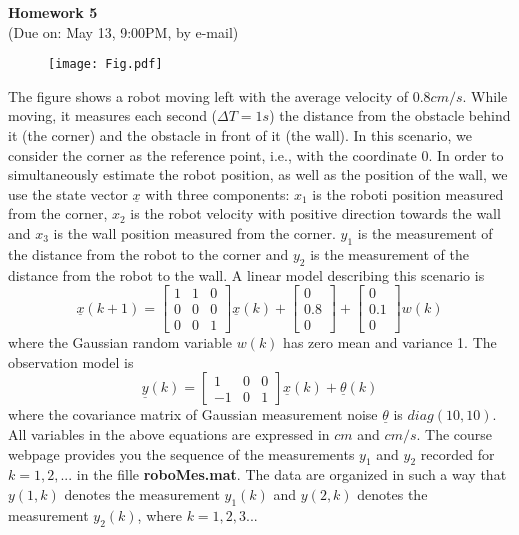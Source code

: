 \documentclass{article}
\begin{document}
 
\begin{center}
{\bf \Large  Homework 5} \\
(Due on: May 13, 9:00PM, by e-mail)
\end{center}

\begin{figure}[h]
\begin{center}
\texttt{[image: Fig.pdf]}
\end{center}
\end{figure}

\noindent The figure shows a robot moving left with the average velocity of $0.8cm/s$.
While moving, it measures each second ($\Delta T = 1s$) the distance from the obstacle
behind it (the corner) and the obstacle in front of it (the wall). In this scenario,
we consider the corner as the reference point, i.e., with the coordinate 0. 
In order to simultaneously estimate the robot position, as well
as the position of the wall, we use the state vector $\underline{x}$ with three components: 
$x_1$ is the roboti position measured from the corner, $x_2$ is the robot velocity with
positive direction towards the wall and $x_3$ is the wall position measured from
the corner.  $y_1$ is the measurement of the distance from the robot to the corner
and $y_2$ is the measurement of the distance from the robot to the wall. A linear model describing this scenario is
\begin{equation}
  \underline{x}(k+1)=\left[ 
  \begin{array}{ccc}
     1 & 1 & 0  \\
     0 & 0 & 0  \\
     0 & 0 & 1 
  \end{array}
   \right] \underline{x}(k)+
   \left[ 
  \begin{array}{c}
     0   \\
     0.8   \\
     0
  \end{array}
   \right]+ \left[
     \begin{array}{c}
     0   \\
     0.1   \\
     0
  \end{array}
   \right] w(k)
\end{equation}
where the Gaussian random variable $w(k)$ has zero mean and variance 1. 
The observation model is
\begin{equation}
 \underline{y}(k) =\left[
     \begin{array}{ccc}
     1 & 0 &  0  \\
     -1 & 0 & 1   
  \end{array}
   \right] \underline{x}(k)+\underline{\theta}(k)
\end{equation}
where the covariance matrix of Gaussian measurement noise $\underline{\theta}$ is $diag(10, 10)$. All variables in the above equations are expressed in $cm$ and $cm/s$. The course webpage provides you the sequence of the measurements $y_1$ and $y_2$ recorded for 
$k = 1, 2,... $ in the fille {\bf roboMes.mat}. The data are organized in such a way that $y(1, k)$ denotes the measurement $y_1(k)$ and $y(2, k)$ denotes the measurement $y_2(k)$, where $k=1,2,3...$
\end{document}
